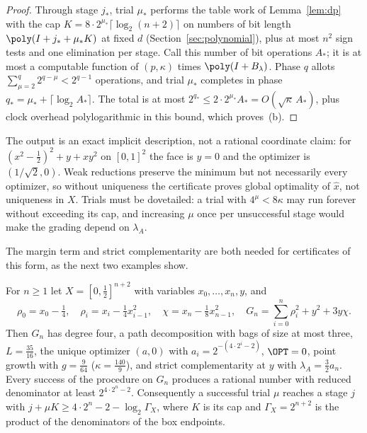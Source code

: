 \begin{proof}
Through stage $j_*$, trial $\mu_*$ performs the table work of
Lemma~\ref{lem:dp} with the cap $K=8\cdot2^{\mu_*}\lceil\log_2(n+2)\rceil$ on
numbers of bit length $\poly(I+j_*+\mu_*K)$ at fixed $d$
(Section~\ref{sec:polynomial}), plus at most $n^2$ sign tests and one
elimination per stage. Call this number of bit operations $A_*$; it is at
most a computable function of $(p,\kappa)$ times $\poly(I+B_\lambda)$. Phase
$q$ allots $\sum_{\mu=2}^q2^{q-\mu}<2^{q-1}$ operations, and trial $\mu_*$
completes in phase $q_*=\mu_*+\lceil\log_2A_*\rceil$. The total is at most
$2^{q_*}\le2\cdot2^{\mu_*}A_*=O(\sqrt\kappa\,A_*)$, plus clock overhead
polylogarithmic in this bound, which proves~(b).
\end{proof}

The output is an exact implicit description, not a rational coordinate claim:
for $(x^2-\frac12)^2+y+xy^2$ on $[0,1]^2$ the face is $y=0$ and the optimizer
is $(1/\sqrt2,0)$. Weak reductions preserve the minimum but not necessarily
every optimizer, so without uniqueness the certificate proves global
optimality of $\hat x$, not uniqueness in $X$. Trials must be dovetailed: a
trial with $4^\mu<8\kappa$ may run forever without exceeding its cap, and
increasing $\mu$ once per unsuccessful stage would make the grading depend on
$\lambda_A$.

The margin term and strict complementarity are both needed for certificates
of this form, as the next two examples show.

\begin{proposition}\label{prop:margin}
For $n\ge1$ let $X=[0,\frac12]^{n+2}$ with variables $x_0,\ldots,x_n,y$, and
\[
\rho_0=x_0-\tfrac14,\quad \rho_i=x_i-\tfrac14x_{i-1}^2,\quad
\chi=x_n-\tfrac18x_{n-1}^2,\quad
G_n=\sum_{i=0}^n\rho_i^2+y^2+3y\chi.
\]
Then $G_n$ has degree four, a path decomposition with bags of size at most
three, $L=\frac{35}{16}$, the unique optimizer $(a,0)$ with
$a_i=2^{-(4\cdot2^i-2)}$, $\OPT=0$, point growth with $g=\frac9{64}$
($\kappa=\frac{140}9$), and strict complementarity at $y$ with
$\lambda_A=\frac32a_n$. Every success of the procedure on $G_n$ produces a
rational number with reduced denominator at least $2^{4\cdot2^n-2}$.
Consequently a successful trial $\mu$ reaches a stage $j$ with
$j+\mu K\ge4\cdot2^n-2-\log_2\Gamma_X$, where $K$ is its cap and
$\Gamma_X=2^{n+2}$ is the product of the denominators of the box endpoints.
\end{proposition}

